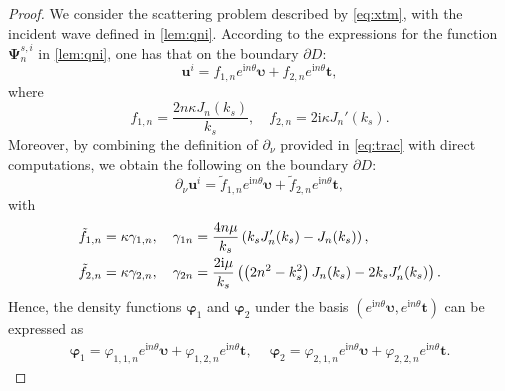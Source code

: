 \documentclass[10pt,a4paper]{amsart}
\newcommand{\bu}{\mathbf{u}}
\begin{document}
\begin{proof}
	We consider the scattering problem described by \eqref{eq:xtm}, with the incident wave defined in \eqref{lem:qni}. According to the expressions for the function \(\bm{\Psi}_{n}^{s,i}\) in \eqref{lem:qni}, one has that on the boundary \(\partial D\):
	\begin{displaymath}
		{\bu}^{i}=f_{1,n}e^{\mathrm{i}n\theta}\bm{\upsilon }+f_{2,n}e^{\mathrm{i}n\theta}\bm{t },
	\end{displaymath}
	where
	\begin{displaymath}
		f_{1,n}=\frac{2n\kappa J_n(k_{s})}{k_{s}},\quad f_{2,n}=2\mathrm{i}\kappa J_{n}'(k_{s}).
	\end{displaymath}
	Moreover, by combining the definition of \(\partial_\nu\) provided in \eqref{eq:trac} with direct computations, we obtain the following on the boundary \(\partial D\):
	\begin{displaymath}
		\partial_\nu\bu^{i}=\tilde{f}_{1,n}e^{\mathrm{i}n\theta}\bm{\upsilon }+\tilde{f}_{2,n}e^{\mathrm{i}n\theta}\bm{t },
	\end{displaymath}
	with \begin{align}
		\tilde{f}_{1,n}&=\kappa \gamma_{1,n},\quad \gamma_{1n}=\frac{4n\mu}{k_s}\left(k_sJ_n'(k_s)-J_n(k_s)\right),\notag\\
		\tilde{f}_{2,n}&=\kappa \gamma_{2,n},\quad \gamma_{2n}=\frac{2\mathrm{i}\mu}{k_s}\left(\left(2n^2-k_s^2\right)J_n(k_s)-2k_sJ_n'(k_s)\right).\notag
	\end{align}
	Hence, the density functions \(\bm{\varphi}_{1}\) and \(\bm{\varphi}_{2}\) under the basis \(\left(e^{\mathrm{i}n\theta}\bm{\upsilon}, e^{\mathrm{i}n\theta}\bm{t}\right)\) can be expressed as
	\begin{align}\label{eq:phizh}
		\bm{\varphi}_1=\varphi_{1,1,n}e^{\mathrm{i}n\theta}\bm{\upsilon }+\varphi_{1,2,n}e^{\mathrm{i}n\theta}\bm{t },\quad\ \bm{\varphi}_2=\varphi_{2,1,n}e^{\mathrm{i}n\theta}\bm{\upsilon }+\varphi_{2,2,n}e^{\mathrm{i}n\theta}\bm{t }.
	\end{align}
	

\end{proof}
\end{document}
